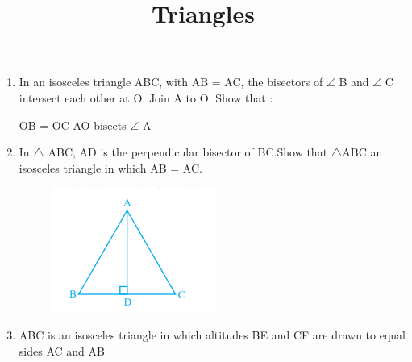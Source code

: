 \documentclass[12pt]{article}
\begin{document}
\title{\textbf{Triangles}}
\maketitle
\begin{center}
\end{center}

\begin{enumerate}
\section*{9$^{th}$ Maths - Chapter 7}

\item In an isosceles triangle ABC, with AB = AC, the bisectors of $\angle$ B and $\angle$ C intersect
each other at O. Join A to O. Show that :
\begin{enumerate}
OB = OC  AO bisects $\angle$ A
\end{enumerate}
\item In $\triangle$ ABC, AD is the perpendicular bisector of BC.Show that $\triangle$ABC an isosceles
triangle in which AB = AC.
\begin{figure}[!h]
\begin{center}
\includegraphics[width=\columnwidth]{./figs/triangle2.png}
\end{center}                                      \caption{}                                        \label{fig:Fig1}                                  \end{figure}
\item ABC is an isosceles triangle in which altitudes BE and CF are drawn to equal sides AC and AB

\end{enumerate}
\end{document}
